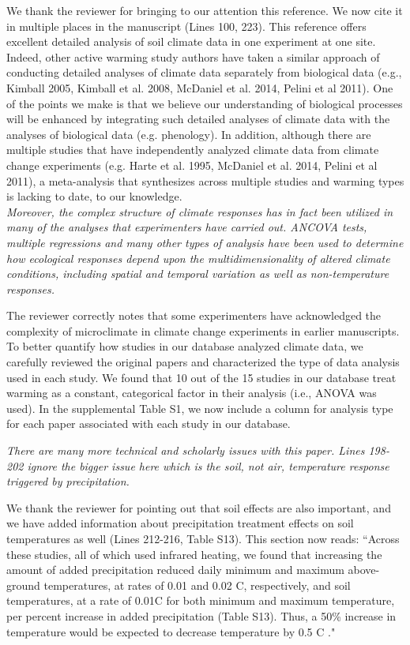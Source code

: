 \documentclass[11pt,a4paper]{letter}
\begin{document}
\begin{letter}{}
We thank the reviewer for bringing to our attention this reference. We now cite it in multiple places in the manuscript (Lines 100, 223). This reference offers excellent detailed analysis of soil climate data in one experiment at one site. Indeed, other active warming study authors have taken a similar approach of conducting detailed analyses of climate data separately from biological data (e.g., Kimball 2005, Kimball et al. 2008, McDaniel et al. 2014, Pelini et al 2011). One of the points we make is that we believe our understanding of biological processes will be enhanced by integrating such detailed analyses of climate data with the analyses of biological data (e.g. phenology). In addition, although there are multiple studies that have independently analyzed climate data from climate change experiments (e.g. Harte et al. 1995, McDaniel et al. 2014, Pelini et al 2011), a meta-analysis that synthesizes across multiple studies and warming types is lacking to date, to our knowledge.\\

\emph{Moreover, the complex structure of climate responses has in fact been utilized in many of the analyses that experimenters have carried out.  ANCOVA tests, multiple regressions and many other types of analysis have been used to determine how ecological responses depend upon the multidimensionality of altered climate conditions, including spatial and temporal variation as well as non-temperature responses.}

The reviewer correctly notes that some experimenters have acknowledged the complexity of microclimate in climate change experiments in earlier manuscripts. To better quantify how studies in our database analyzed climate data, we carefully reviewed the original papers and characterized the type of data analysis used in each study. We found that 10 out of the 15 studies in our database treat warming as a constant, categorical factor in their analysis (i.e., ANOVA was used). In the supplemental Table S1,   
we now include a column for analysis type for each paper associated with each study in our database. 

\par \emph{There are many more technical and scholarly issues with this paper.  Lines 198-202 ignore the bigger issue here which is the soil, not air, temperature response triggered by precipitation.}
\par We thank the reviewer for pointing out that soil effects are also important, and we have added information about precipitation treatment effects on soil temperatures as well (Lines 212-216, Table S13). This section now reads:
``Across these studies, all of which used infrared heating, we found that increasing the amount of added precipitation reduced daily minimum and maximum above-ground temperatures, at rates of 0.01 and 0.02 \degree C, respectively, and soil temperatures, at a rate of 0.01\degree C for both minimum and maximum temperature, per percent increase in added precipitation (Table S13). Thus, a 50\% increase in temperature would be expected to decrease temperature by 0.5 \degree C ."\\


\end{letter}
\end{document}
